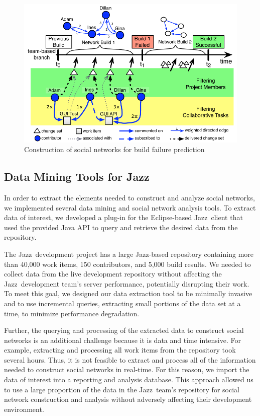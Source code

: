 \documentclass[12pt,oneside]{book}
\newcommand{\jazztm}{Jazz}
\begin{document}
\begin{figure}[tb]
\begin{center}
\includegraphics[width=1.3\columnwidth]{./figures/BuildResultNetworks}
\caption{Construction of social networks for build failure prediction}
\label{fig:BuildSNs}
\end{center}
\end{figure}

\subsection{Data Mining Tools for \jazztm}
In order to extract the elements needed to construct and analyze social networks,
we implemented several data mining and social network analysis tools. To extract
data of interest, we developed a plug-in for the Eclipse-based \jazztm\ client
that used the provided Java API to query and retrieve the desired data from the
repository.

The \jazztm\ development project has a large \jazztm-based repository containing
more than 40,000 work items, 150 contributors, and 5,000 build results. We
needed to collect data from the live development repository without affecting the
\jazztm\ development team's server performance, potentially disrupting their
work. To meet this goal, we designed our data extraction tool to be minimally
invasive and to use incremental queries, extracting small portions of the data
set at a time, to minimize performance degradation.

Further, the querying and processing of the extracted data to construct social
networks is an additional challenge because it is data and time intensive. For
example, extracting and processing all work items from the repository took
several hours. Thus, it is not feasible to extract and process all of the
information needed to construct social networks in real-time. For this reason, we
import the data of interest into a reporting and analysis database. This approach
allowed us to use a large proportion of the data in the \jazztm\ team's
repository for social network construction and analysis without adversely
affecting their development environment.
\end{document}
